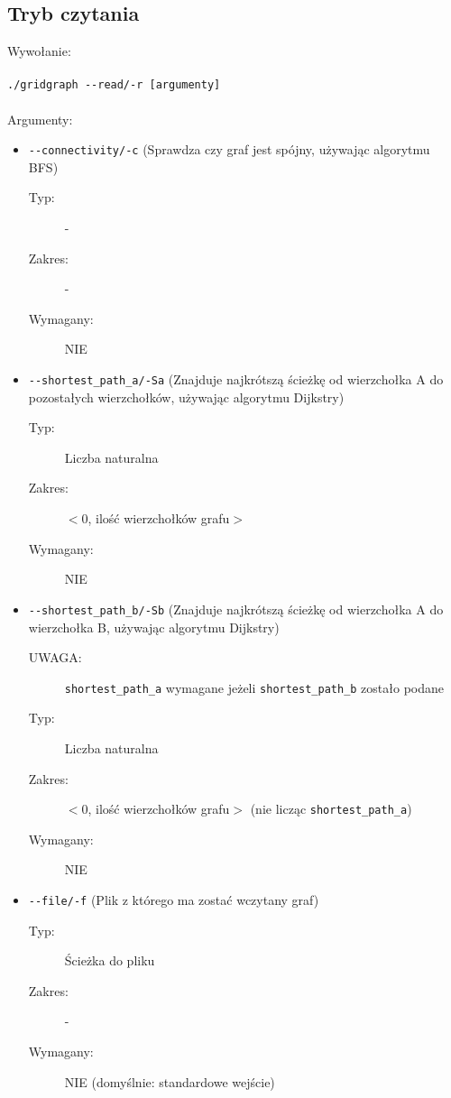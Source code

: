 \documentclass[11pt,a4paper]{report}
\begin{document}
    \subsection{Tryb czytania}
    Wywołanie:\\
    \\
    \verb|./gridgraph --read/-r [argumenty]|\\
    \\
    Argumenty:
    \begin{itemize}
        \item \verb|--connectivity/-c| (Sprawdza czy graf jest spójny, używając algorytmu BFS)
        \begin{description}
            \item[Typ:] -
            \item[Zakres:] -
            \item[Wymagany:] NIE\footnotemark
        \end{description}
        \item \verb|--shortest_path_a/-Sa| (Znajduje najkrótszą ścieżkę od wierzchołka A do pozostałych wierzchołków, używając algorytmu Dijkstry)
        \begin{description}
            \item[Typ:] Liczba naturalna
            \item[Zakres:] $<$0, ilość wierzchołków grafu$>$
            \item[Wymagany:] NIE\footnotemark[\value{footnote}]
        \end{description}
        \item \verb|--shortest_path_b/-Sb| (Znajduje najkrótszą ścieżkę od wierzchołka A do wierzchołka B, używając algorytmu Dijkstry)
        \begin{description}
            \item[UWAGA:] \verb|shortest_path_a| wymagane jeżeli \verb|shortest_path_b| zostało podane
            \item[Typ:] Liczba naturalna
            \item[Zakres:] $<$0, ilość wierzchołków grafu$>$ (nie licząc \verb|shortest_path_a|)
            \item[Wymagany:] NIE\footnotemark[\value{footnote}]
        \end{description}
        \item \verb|--file/-f| (Plik z którego ma zostać wczytany graf)
        \begin{description}
            \item[Typ:] Ścieżka do pliku
            \item[Zakres:] -
            \item[Wymagany:] NIE (domyślnie: standardowe wejście)
        \end{description}
    \end{itemize}
\end{document}

